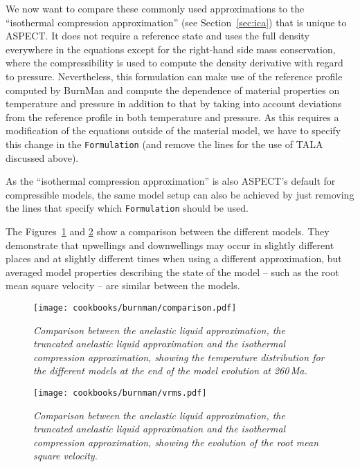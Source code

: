 \documentclass{article}
\newcommand{\aspect}{\textsc{ASPECT}}
\begin{document}
We now want to compare these commonly used approximations to the ``isothermal compression approximation''
(see Section~\ref{sec:ica}) that is unique to \aspect{}. It does not require a reference state and uses 
the full density everywhere in the equations except for the right-hand side  mass conservation, where the 
compressibility is used to compute the density derivative with regard to pressure. 
Nevertheless, this formulation can make use of the reference profile computed by BurnMan and compute the 
dependence of material properties on temperature and pressure in addition to that by taking into account 
deviations from the reference profile in both temperature and pressure. As this requires a modification 
of the equations outside of the material model, we have to specify this change in the 
\texttt{Formulation} (and remove the lines for the use of TALA discussed above). 

As the ``isothermal compression approximation'' is also \aspect{}'s default for compressible models, 
the same model setup can also be achieved by just removing the lines that specify which \texttt{Formulation}
should be used. 

The Figures~\ref{fig:burnman-comparison} and \ref{fig:burnman-vrms} show a comparison between the different 
models. They demonstrate that upwellings and downwellings may occur in slightly different places and at 
slightly different times when using a different approximation, but averaged model properties describing 
the state of the model -- such as the root mean square velocity -- are similar between the models. 

\begin{figure}
\centering
  \texttt{[image: cookbooks/burnman/comparison.pdf]}
  \caption{\it Comparison between the anelastic liquid approximation, 
               the truncated anelastic liquid approximation 
               and the isothermal compression approximation, 
               showing the temperature distribution for the different models at 
               the end of the model evolution at 260\,Ma.}
  \label{fig:burnman-comparison}
\end{figure}

\begin{figure}
\centering
  \texttt{[image: cookbooks/burnman/vrms.pdf]}
  \caption{\it Comparison between the anelastic liquid approximation, 
               the truncated anelastic liquid approximation 
               and the isothermal compression approximation,
               showing the evolution of the root mean square velocity.}
  \label{fig:burnman-vrms}
\end{figure}
\end{document}
